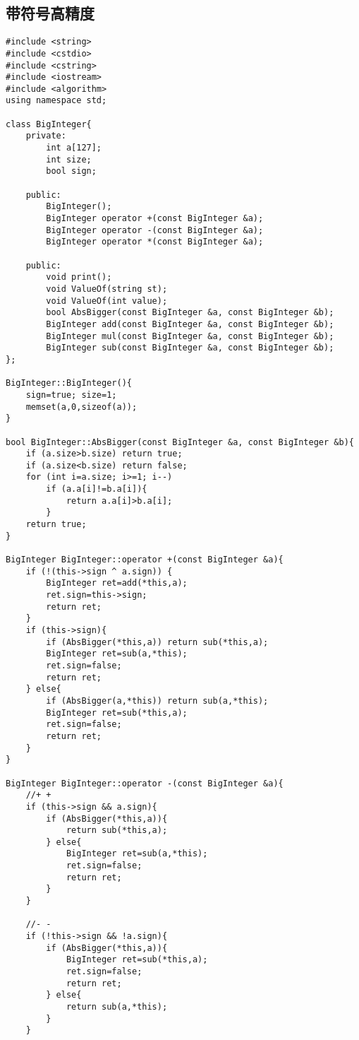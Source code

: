 \subsection{带符号高精度}
\begin{verbatim}
#include <string>
#include <cstdio>
#include <cstring>
#include <iostream>
#include <algorithm>
using namespace std;

class BigInteger{
    private:
        int a[127];
        int size;
        bool sign;
    
    public:
        BigInteger();
        BigInteger operator +(const BigInteger &a);
        BigInteger operator -(const BigInteger &a);
        BigInteger operator *(const BigInteger &a);
    
    public:
        void print();
        void ValueOf(string st);
        void ValueOf(int value);
        bool AbsBigger(const BigInteger &a, const BigInteger &b);
        BigInteger add(const BigInteger &a, const BigInteger &b);
        BigInteger mul(const BigInteger &a, const BigInteger &b);
        BigInteger sub(const BigInteger &a, const BigInteger &b);
};

BigInteger::BigInteger(){
    sign=true; size=1;
    memset(a,0,sizeof(a));
}

bool BigInteger::AbsBigger(const BigInteger &a, const BigInteger &b){
    if (a.size>b.size) return true;
    if (a.size<b.size) return false;
    for (int i=a.size; i>=1; i--)
        if (a.a[i]!=b.a[i]){
            return a.a[i]>b.a[i];
        }
    return true;
}

BigInteger BigInteger::operator +(const BigInteger &a){
    if (!(this->sign ^ a.sign)) {
        BigInteger ret=add(*this,a);
        ret.sign=this->sign;
        return ret;
    }
    if (this->sign){
        if (AbsBigger(*this,a)) return sub(*this,a); 
        BigInteger ret=sub(a,*this);
        ret.sign=false;
        return ret;
    } else{
        if (AbsBigger(a,*this)) return sub(a,*this);
        BigInteger ret=sub(*this,a);
        ret.sign=false;
        return ret;
    }
}

BigInteger BigInteger::operator -(const BigInteger &a){
    //+ +
    if (this->sign && a.sign){
        if (AbsBigger(*this,a)){
            return sub(*this,a);
        } else{
            BigInteger ret=sub(a,*this);
            ret.sign=false;
            return ret;
        }
    }

    //- -
    if (!this->sign && !a.sign){
        if (AbsBigger(*this,a)){
            BigInteger ret=sub(*this,a);
            ret.sign=false;
            return ret;
        } else{
            return sub(a,*this);
        }
    }
    

\end{verbatim}
